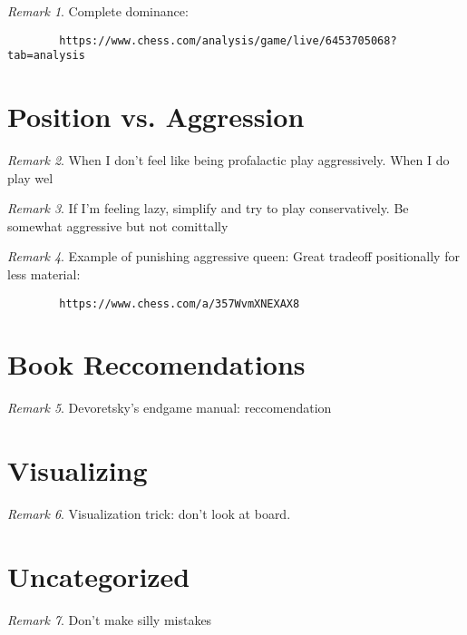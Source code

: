\documentclass[11pt]{article}
\theoremstyle{remark}
\newtheorem{remark}{Remark}
\begin{document}
\begin{remark}
	Complete dominance:
	\begin{verbatim}
		https://www.chess.com/analysis/game/live/6453705068?tab=analysis
	\end{verbatim}
	
\end{remark}


\section{Position vs. Aggression}

\begin{remark}
	When I don't feel like being profalactic play aggressively. When I do play wel
\end{remark}

\begin{remark}
	If I'm feeling lazy, simplify and try to play conservatively. Be somewhat aggressive but not comittally
\end{remark}

\begin{remark}
	Example of punishing aggressive queen: Great tradeoff positionally for less material: 
	\begin{verbatim}
		https://www.chess.com/a/357WvmXNEXAX8
	\end{verbatim}
\end{remark}

\section{Book Reccomendations}

\begin{remark}
	Devoretsky's endgame manual: reccomendation
\end{remark}

\section{Visualizing}

\begin{remark}
	Visualization trick: don't look at board.
\end{remark}

\section{Uncategorized}

\begin{remark}
	Don't make silly mistakes
\end{remark}
\end{document}
